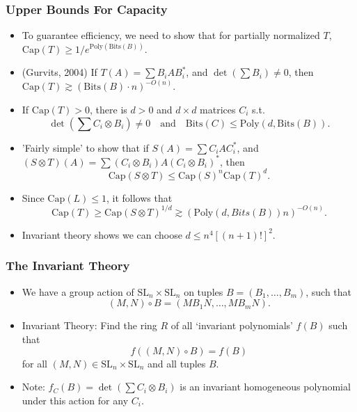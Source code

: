 \documentclass[usenames,dvipsnames,12pt]{beamer}
\begin{document}
\begin{frame}

\frametitle{Upper Bounds For Capacity}

\begin{itemize}
    \pause
    \item To guarantee efficiency, we need to show that for partially normalized $T$, $\text{Cap}(T) \geq 1/e^{\text{Poly}(\text{Bits}(B))}$.

    \pause
    \item (Gurvits, 2004) If $T(A) = \sum B_i A B_i^*$, and $\det(\sum B_i) \neq 0$, then $\text{Cap}(T) \gtrsim (\text{Bits}(B) \cdot n)^{- O(n)}$.

    \pause
    \item If $\text{Cap}(T) > 0$, there is $d > 0$ and $d \times d$ matrices $C_i$ s.t.
    \[ \det(\sum C_i \otimes B_i) \neq 0 \quad\text{and}\quad \text{Bits}(C) \leq \text{Poly}(d,\text{Bits}(B)). \]

    \pause
    \item 'Fairly simple' to show that if $S(A) = \sum C_i A C_i^*$, and $(S \otimes T)(A) = \sum (C_i \otimes B_i) A (C_i \otimes B_i)^*$, then
    \[ \text{Cap}(S \otimes T) \leq \text{Cap}(S)^n \text{Cap}(T)^d. \]

    \pause
    \item Since $\text{Cap}(L) \leq 1$, it follows that
    \[ \text{Cap}(T) \geq \text{Cap}(S \otimes T)^{1/d} \gtrsim (\text{Poly}(d, Bits(B)) n)^{-O(n)}. \]

    \pause
    \item Invariant theory shows we can choose $d \leq n^4 [(n+1)!]^2$.
\end{itemize}

\end{frame}








\begin{frame}

\frametitle{The Invariant Theory}

\begin{itemize}
    \pause
    \item We have a group action of $\text{SL}_n \times \text{SL}_n$ on tuples $B = (B_1,\dots,B_m)$, such that
    \[ (M,N) \circ B = (MB_1N, \dots, MB_mN). \]

    \pause
    \item Invariant Theory: Find the ring $R$ of all `invariant polynomials' $f(B)$ such that
    \[ f((M,N) \circ B) = f(B) \]
    for all $(M,N) \in \text{SL}_n \times \text{SL}_n$ and all tuples $B$.

    \pause
    \item Note: $f_C(B) = \det(\sum C_i \otimes B_i)$ is an invariant homogeneous polynomial under this action for any $C_i$.
\end{itemize}

\end{frame}
\end{document}
